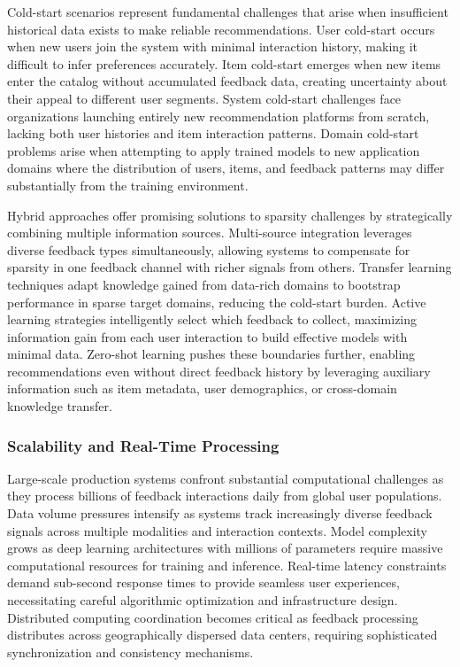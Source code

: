 Cold-start scenarios represent fundamental challenges that arise when insufficient historical data exists to make reliable recommendations. User cold-start occurs when new users join the system with minimal interaction history, making it difficult to infer preferences accurately. Item cold-start emerges when new items enter the catalog without accumulated feedback data, creating uncertainty about their appeal to different user segments. System cold-start challenges face organizations launching entirely new recommendation platforms from scratch, lacking both user histories and item interaction patterns. Domain cold-start problems arise when attempting to apply trained models to new application domains where the distribution of users, items, and feedback patterns may differ substantially from the training environment.

Hybrid approaches offer promising solutions to sparsity challenges by strategically combining multiple information sources. Multi-source integration leverages diverse feedback types simultaneously, allowing systems to compensate for sparsity in one feedback channel with richer signals from others. Transfer learning techniques adapt knowledge gained from data-rich domains to bootstrap performance in sparse target domains, reducing the cold-start burden. Active learning strategies intelligently select which feedback to collect, maximizing information gain from each user interaction to build effective models with minimal data. Zero-shot learning pushes these boundaries further, enabling recommendations even without direct feedback history by leveraging auxiliary information such as item metadata, user demographics, or cross-domain knowledge transfer.

\subsubsection{Scalability and Real-Time Processing}

Large-scale production systems confront substantial computational challenges as they process billions of feedback interactions daily from global user populations. Data volume pressures intensify as systems track increasingly diverse feedback signals across multiple modalities and interaction contexts. Model complexity grows as deep learning architectures with millions of parameters require massive computational resources for training and inference. Real-time latency constraints demand sub-second response times to provide seamless user experiences, necessitating careful algorithmic optimization and infrastructure design. Distributed computing coordination becomes critical as feedback processing distributes across geographically dispersed data centers, requiring sophisticated synchronization and consistency mechanisms.


